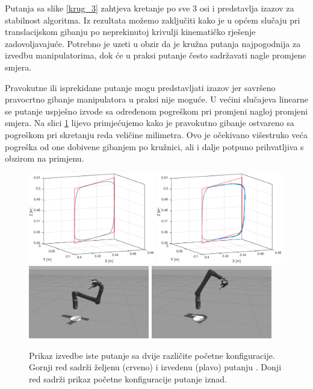 \documentclass[times, utf8, diplomski, numeric]{fer}
\begin{document}
Putanja sa slike \ref{krug_3} zahtjeva kretanje po sve 3 osi i predstavlja izazov za stabilnost algoritma.
Iz rezultata možemo zaključiti kako je u općem slučaju pri translacijskom gibanju po neprekinutoj krivulji kinematičko rješenje zadovoljavajuće.
Potrebno je uzeti u obzir da je kružna putanja najpogodnija za izvedbu manipulatorima, dok će u praksi putanje često sadržavati nagle promjene smjera.

Pravokutne ili isprekidane putanje mogu predstavljati izazov jer savršeno pravocrtno gibanje manipulatora u praksi nije moguće.
U većini slučajeva linearne se putanje uspješno izvode sa određenom pogreškom pri promjeni nagloj promjeni smjera.
Na slici \ref{pravokutnik} lijevo primjećujemo kako je pravokutno gibanje ostvareno sa pogreškom pri skretanju reda veličine milimetra.
Ovo je očekivano višestruko veća pogreška od one dobivene gibanjem po kružnici, ali i dalje potpuno prihvatljiva s obzirom na primjenu.
\begin{figure}[h!]
\centering
\includegraphics[width=0.49\textwidth]{xyz_pravokutnik2}
\includegraphics[width=0.49\textwidth]{xyz_pravokutnik}
\includegraphics[width=0.47\textwidth]{konf1}
\includegraphics[width=0.47\textwidth]{konf2}
\caption{Prikaz izvedbe iste putanje sa dvije različite početne konfiguracije. Gornji red sadrži željenu (crveno) i izvedenu (plavo)  putanju .
Donji red sadrži prikaz početne konfiguracije putanje iznad.} \label{pravokutnik}
\end{figure}
\end{document}

